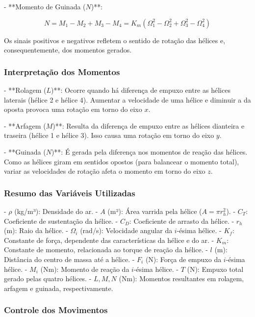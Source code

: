 - **Momento de Guinada (\( N \))**:

\begin{equation}
N = M_1 - M_2 + M_3 - M_4 = K_m (\Omega_1^2 - \Omega_2^2 + \Omega_3^2 - \Omega_4^2)
\label{eq:momento_guinada}
\end{equation}

Os sinais positivos e negativos refletem o sentido de rotação das hélices e, consequentemente, dos momentos gerados.

\subsubsection{Interpretação dos Momentos}

- **Rolagem (\( L \))**: Ocorre quando há diferença de empuxo entre as hélices laterais (hélice 2 e hélice 4). Aumentar a velocidade de uma hélice e diminuir a da oposta provoca uma rotação em torno do eixo \( x \).

- **Arfagem (\( M \))**: Resulta da diferença de empuxo entre as hélices dianteira e traseira (hélice 1 e hélice 3). Isso causa uma rotação em torno do eixo \( y \).

- **Guinada (\( N \))**: É gerada pela diferença nos momentos de reação das hélices. Como as hélices giram em sentidos opostos (para balancear o momento total), variar as velocidades de rotação afeta o momento em torno do eixo \( z \).

\subsubsection{Resumo das Variáveis Utilizadas}

- \( \rho \) (kg/m³): Densidade do ar.
- \( A \) (m²): Área varrida pela hélice (\( A = \pi r_h^2 \)).
- \( C_T \): Coeficiente de sustentação da hélice.
- \( C_D \): Coeficiente de arrasto da hélice.
- \( r_h \) (m): Raio da hélice.
- \( \Omega_i \) (rad/s): Velocidade angular da \( i \)-ésima hélice.
- \( K_f \): Constante de força, dependente das características da hélice e do ar.
- \( K_m \): Constante de momento, relacionada ao torque de reação da hélice.
- \( l \) (m): Distância do centro de massa até a hélice.
- \( F_i \) (N): Força de empuxo da \( i \)-ésima hélice.
- \( M_i \) (Nm): Momento de reação da \( i \)-ésima hélice.
- \( T \) (N): Empuxo total gerado pelas quatro hélices.
- \( L, M, N \) (Nm): Momentos resultantes em rolagem, arfagem e guinada, respectivamente.

\subsubsection{Controle dos Movimentos}

